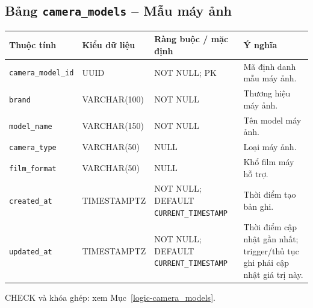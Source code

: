 \subsection{Bảng \texttt{camera\_\allowbreak{}models} -- Mẫu máy ảnh}
\label{dictionary-camera_models}
\begingroup
\footnotesize
\setlength{\tabcolsep}{3pt}
\begin{longtable}{>{\raggedright\arraybackslash}p{3.1cm}>{\raggedright\arraybackslash}p{2.5cm}>{\raggedright\arraybackslash}p{3.7cm}>{\raggedright\arraybackslash}p{4.3cm}}
\toprule
Thuộc tính & Kiểu dữ liệu & Ràng buộc / mặc định & Ý nghĩa \\
\midrule
\endhead
\texttt{camera\_\allowbreak{}model\_\allowbreak{}id} & UUID & NOT NULL; PK & Mã định danh mẫu máy ảnh. \\
\texttt{brand} & VARCHAR(100) & NOT NULL & Thương hiệu máy ảnh. \\
\texttt{model\_\allowbreak{}name} & VARCHAR(150) & NOT NULL & Tên model máy ảnh. \\
\texttt{camera\_\allowbreak{}type} & VARCHAR(50) & NULL & Loại máy ảnh. \\
\texttt{film\_\allowbreak{}format} & VARCHAR(50) & NULL & Khổ film máy hỗ trợ. \\
\texttt{created\_\allowbreak{}at} & TIMESTAMPTZ & NOT NULL; DEFAULT \texttt{CURRENT\_\allowbreak{}TIMESTAMP} & Thời điểm tạo bản ghi. \\
\texttt{updated\_\allowbreak{}at} & TIMESTAMPTZ & NOT NULL; DEFAULT \texttt{CURRENT\_\allowbreak{}TIMESTAMP} & Thời điểm cập nhật gần nhất; trigger/thủ tục ghi phải cập nhật giá trị này. \\
\bottomrule
\end{longtable}
\endgroup
CHECK và khóa ghép: xem Mục~\ref{logic-camera_models}.
